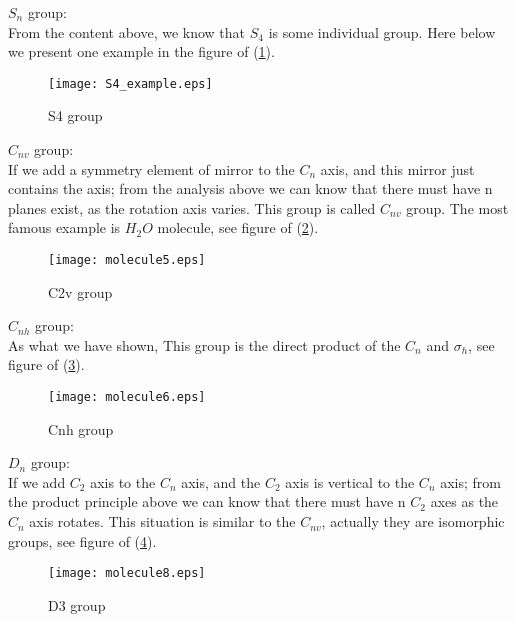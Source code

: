 $S_{n}$ group: \\
From the content above, we know that $S_{4}$ is some individual
group. Here below we present one example in the figure of
(\ref{GROUP7}).
\begin{figure}[htp]
  \begin{center}
    \texttt{[image: S4\_example.eps]}
    \caption{S4 group} \label{GROUP7}
  \end{center}
\end{figure}

$C_{nv}$ group: \\
If we add a symmetry element of mirror to the $C_{n}$ axis, and this
mirror just contains the axis; from the analysis above we can know
that there must have n planes exist, as the rotation axis varies.
This group is called $C_{nv}$ group. The most famous example is
$H_{2}O$ molecule, see figure of (\ref{GROUP5}).
\begin{figure}[htp]
  \begin{center}
    \texttt{[image: molecule5.eps]}
    \caption{C2v group} \label{GROUP5}
  \end{center}
\end{figure}

$C_{nh}$ group: \\
As what we have shown, This group is the direct product of the $C_{n}$
and $\sigma_{h}$, see figure of (\ref{GROUP6}).
\begin{figure}[htp]
  \begin{center}
    \texttt{[image: molecule6.eps]}
    \caption{Cnh group} \label{GROUP6}
  \end{center}
\end{figure}

$D_{n}$ group: \\
If we add $C_{2}$ axis to the $C_{n}$ axis, and the $C_{2}$ axis is
vertical to the $C_{n}$ axis; from the product principle above we can
know that there must have n $C_{2}$ axes as the $C_{n}$ axis
rotates. This situation is similar to the $C_{nv}$, actually they are
isomorphic groups, see figure of (\ref{GROUP8}).
\begin{figure}[htp]
  \begin{center}
    \texttt{[image: molecule8.eps]}
    \caption{D3 group} \label{GROUP8}
  \end{center}
\end{figure}

